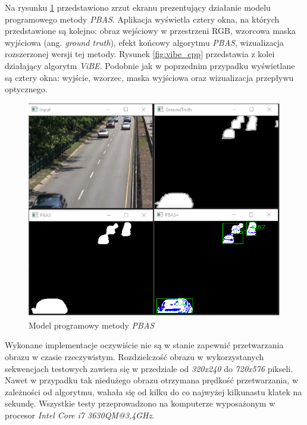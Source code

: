 
Na rysunku \ref{fig:pbas_cpp} przedstawiono zrzut ekranu prezentujący działanie modelu programowego metody \textit{PBAS}. 
Aplikacja wyświetla cztery okna, na których przedstawione są kolejno: obraz wejściowy w przestrzeni RGB, wzorcowa maska wyjściowa (ang. \textit{ground truth}), efekt końcowy algorytmu \textit{PBAS}, wizualizacja rozszerzonej wersji tej metody. 
Rysunek \ref{fig:vibe_cpp} przedstawia z kolei działający algorytm \textit{ViBE}. 
Podobnie jak w poprzednim przypadku wyświetlane są cztery okna: wyjście, wzorzec, maska wyjściowa oraz wizualizacja przepływu optycznego.

    \begin{figure}[h!]
        \centering
        \includegraphics[scale=0.55]{img/4/pbas_module_cpp.png}
        \caption{Model programowy metody \textit{PBAS}}
	    \label{fig:pbas_cpp}
    \end{figure}

Wykonane implementacje oczywiście nie są w stanie zapewnić przetwarzania obrazu w czasie rzeczywistym. %
Rozdzielczość obrazu w wykorzystanych sekwencjach testowych zawiera się w przedziale od \textit{320x240} do \textit{720x576} pikseli. 
Nawet w przypadku tak niedużego obrazu otrzymana prędkość przetwarzania, w zależności od algorytmu, wahała się od kilku do co najwyżej kilkunastu klatek na sekundę. Wszystkie testy przeprowadzono na komputerze wyposażonym w procesor \textit{Intel Core i7 3630QM@3,4GHz}. 

